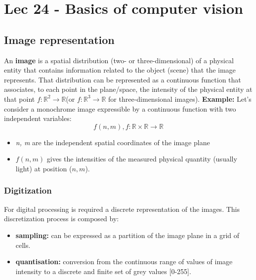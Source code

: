 \chapter{Lec 24 - Basics of computer vision}

\section{Image representation}
An \textbf{image} is a spatial distribution (two- or three-dimensional) of a physical entity that contains information related to the object (scene) that the image represents. That distribution can be represented as a continuous function that associates, to each point in the plane/space, the intensity of the physical entity at that point $f : \mathbb{R}^{2} \rightarrow \mathbb{R}$(or $f : \mathbb{R}^{3} \rightarrow \mathbb{R}$ for three-dimensional images).\newline
\textbf{Example:}\newline
Let's consider a monochrome image expressible by a continuous function with two independent variables:
\[f(n,m), f: \mathbb{R} \times \mathbb{R} \rightarrow \mathbb{R}\]
\begin{itemize}
    \item \textit{n, m} are the independent spatial coordinates of the image plane
    \item $f(n,m)$ gives the intensities of the measured physical quantity (usually light) at position ($n,m$).
\end{itemize}

\subsection{Digitization}
For digital processing is required a discrete representation of the images. This discretization process is composed by:
\begin{itemize}
    \item \textbf{sampling:} can be expressed as a partition of the image plane in a grid of cells.
    \item \textbf{quantisation:} conversion from the continuous range of values of image intensity to a discrete and finite set of grey values [0-255].
\end{itemize}

